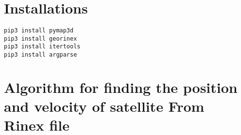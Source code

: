 \section{Installations}

\begin{lstlisting}
pip3 install pymap3d
pip3 install georinex
pip3 install itertools
pip3 install argparse
\end{lstlisting}

\section{Algorithm for finding the position and velocity of satellite From Rinex file}
